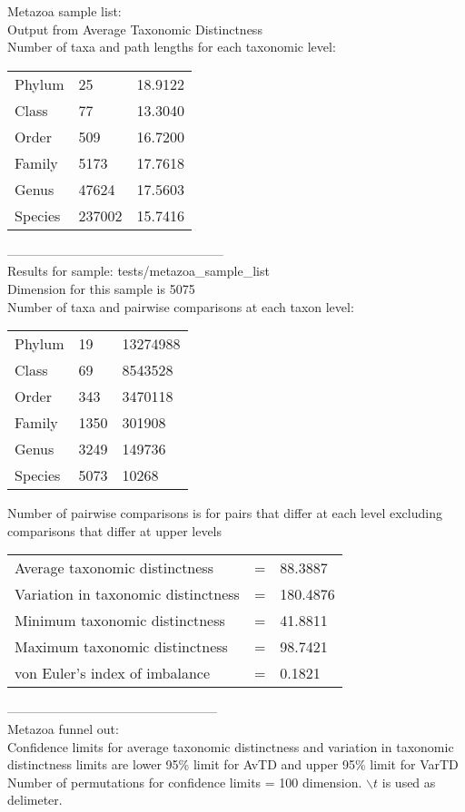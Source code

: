 \documentclass[a4paper,11pt]{article}
\begin{document}
Metazoa sample list:\\
Output from Average Taxonomic Distinctness\\
Number of taxa and path lengths for each taxonomic level:\\
\newline
\begin{tabular}{lll}
Phylum  &  25	& 18.9122\\
Class   &  	77	& 13.3040\\
Order   & 	509	& 16.7200\\
Family  & 	5173 &	17.7618\\
Genus   &  	47624	& 17.5603\\
Species & 	237002 & 15.7416\\
\end{tabular}
\newline
---------------------------------------------------\\
Results for sample: tests/metazoa\_sample\_list\\
Dimension for this sample is 5075\\
Number of taxa and pairwise comparisons  at each taxon level:\\
\newline
\begin{tabular}{lll}
Phylum & 19	& 13274988 \\
Class & 69 &	8543528 \\
Order & 343	& 3470118 \\
Family & 1350	& 301908 \\
Genus & 3249 & 149736 \\
Species &  5073 &	10268 \\
\end{tabular}
Number of pairwise comparisons is for pairs that differ at each level excluding comparisons that differ at upper levels\\
\newline
\begin{tabular}{lll}
Average taxonomic distinctness      & = & 88.3887 \\
Variation in taxonomic distinctness & = & 180.4876 \\
Minimum taxonomic distinctness      & = & 41.8811 \\
Maximum taxonomic distinctness      & = & 98.7421 \\
von Euler's index of imbalance      & = & 0.1821 \\
\end{tabular}\newline
--------------------------------------------------\\
Metazoa funnel out:\\
Confidence limits for average taxonomic distinctness and variation in taxonomic 
distinctness limits are lower 95\% limit for AvTD and upper 95\% limit for VarTD
Number of permutations for confidence limits = 100 dimension. $\backslash t$ is used as delimeter.
\end{document}
